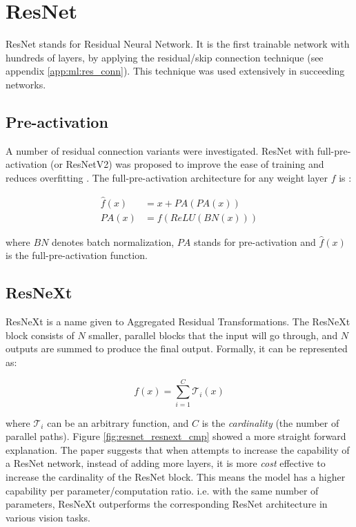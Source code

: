 \section{ResNet}
ResNet stands for Residual Neural Network. It is the first trainable network with hundreds of layers, by applying the residual/skip connection technique (see appendix \ref{app:ml:res_conn}). This technique was used extensively in succeeding networks.

\subsection{Pre-activation}
A number of residual connection variants were investigated. ResNet with full-pre-activation (or ResNetV2) was proposed to improve the ease of training and reduces overfitting \cite{heIdentityMappingsDeep2016a}. The full-pre-activation architecture for any weight layer $f$ is :


\begin{align}
    \hat{f}(x) &= x + PA(PA(x))\\
    PA(x) &= f(ReLU(BN(x)))
\end{align}


where $BN$ denotes batch normalization, $PA$ stands for pre-activation and $\hat{f}(x)$ is the full-pre-activation function. 


\subsection{ResNeXt}
ResNeXt is a name given to Aggregated Residual Transformations\cite{xieAggregatedResidualTransformations2017a}. The ResNeXt block consists of $N$ smaller, parallel blocks that the input will go through, and $N$ outputs are summed to produce the final output. Formally, it can be represented as:

$$
f(x)=\sum^{C}_{i=1} \mathcal{T}_i(x)
$$

where $\mathcal{T}_i$ can be an arbitrary function, and $C$ is the \textit{cardinality} (the number of parallel paths). Figure \ref{fig:resnet_resnext_cmp} showed a more straight forward explanation. The paper suggests that when attempts to increase the capability of a ResNet network, instead of adding more layers, it is more \textit{cost} effective to increase the cardinality of the ResNet block. This means the model has a higher capability per parameter/computation ratio. i.e. with the same number of parameters, ResNeXt outperforms the corresponding ResNet architecture in various vision tasks.

